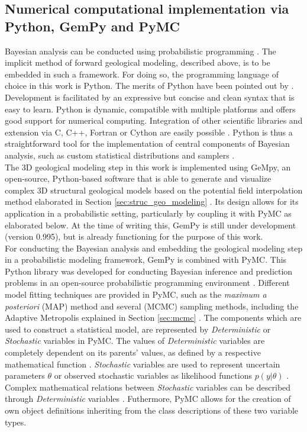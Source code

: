 		\subsection{Numerical computational implementation via Python, GemPy and PyMC}\label{sec:numerical_implementation}
		Bayesian analysis can be conducted using probabilistic programming \citep{salvatier2016pymc3}. The implicit method of forward geological modeling, described above, is to be embedded in such a framework. For doing so, the programming language of choice in this work is Python. The merits of Python have been pointed out by \citet{behnel2010, salvatier2016pymc3, Langtangen2008}. Development is facilitated by an expressive but concise and clean syntax that is easy to learn. Python is dynamic, compatible with multiple platforms and offers good support for numerical computing. Integration of other scientific libraries and extension via C, C++, Fortran or Cython are easily possible \citep{behnel2010, salvatier2016pymc3, Langtangen2008}. Python is thus a straightforward tool for the implementation of central components of Bayesian analysis, such as custom statistical distributions and samplers \citep{salvatier2016pymc3}.\\
		The 3D geological modeling step in this work is implemented using GeMpy, an open-source, Python-based software that is able to generate and visualize complex 3D structural geological models based on the potential field interpolation method elaborated in Section \ref{sec:struc_geo_modeling} \citep{delaVarga2017gempy}. Its design allows for its application in a probabilistic setting, particularly by coupling it with PyMC as elaborated below. At the time of writing this, GemPy is still under development (version 0.995), but is already functioning for the purpose of this work.\\
		For conducting the Bayesian analysis and embedding the geological modeling step in a probabilistic modeling framework, GemPy is combined with PyMC. This Python library was developed for conducting Bayesian inference and prediction problems in an open-source probabilistic programming environment \citep{davidson2015, salvatier2016pymc3}. Different model fitting techniques are provided in PyMC, such as the \textit{maximum a posteriori} (MAP) method and several (MCMC) sampling methods, including the Adaptive Metropolis explained in Section \ref{sec:mcmc} \citep{salvatier2016pymc3}. The components which are used to construct a statistical model, are represented by \textit{Deterministic} or \textit{Stochastic} variables in PyMC. The values of \textit{Deterministic} variables are completely dependent on its parents' values, as defined by a respective mathematical function \citep{salvatier2016pymc3}. \textit{Stochastic} variables are used to represent uncertain parameters $\theta$ or observed stochastic variables as likelihood functions $p(y|\theta)$ \citep{salvatier2016pymc3, delaVarga2016}. Complex mathematical relations between \textit{Stochastic} variables can be described through \textit{Deterministic} variables \citep{delaVarga2016}. Futhermore, PyMC allows for the creation of own object definitions inheriting from the class descriptions of these two variable types.\\
